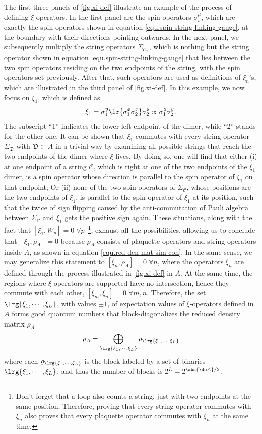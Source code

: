 The first three panels of \autoref{fig.xi-def} illustrate an example of the process of defining $\xi$-operators. In the first panel are the spin operators $\sigma^\mu_i$, which are exactly the spin operators shown in equation \eqref{equ.spin-string-linking-gauge}, at the boundary with their directions pointing outwards. In the next panel, we subsequently multiply the string operators $\Sigma_{\mathcal{C}_n}$, which is nothing but the string operator shown in equation \eqref{equ.spin-string-linking-gauge} that lies between the two spin operators residing on the two endpoints of the string, with the spin operators set previously. After that, such operators are used as definitions of $\xi_n$'s, which are illustrated in the third panel of \autoref{fig.xi-def}. In this example, we now focus on $\xi_1$, which is defined as
\[
\xi_1 = \sigma^y_1\lr{\sigma^x_1\sigma^x_2}\sigma^z_2 \propto \sigma_1^z\sigma_2^y.
\]
The subscript ``1'' indicates the lower-left endpoint of the dimer, while ``2'' stands for the other one. It can be shown that $\xi_1$ commutes with every string operator $\Sigma_{\mathfrak{D}}$ with $\mathfrak{D}\subset A$ in a trivial way by examining all possible strings that reach the two endpoints of the dimer where $\xi$ lives. By doing so, one will find that either (i) at one endpoint of a string $\mathcal{C}$, which is right at one of the two endpoints of the $\xi_1$ dimer, is a spin operator whose direction is parallel to the spin operator of $\xi_1$ on that endpoint; Or (ii) none of the two spin operators of $\Sigma_{\mathcal{C}}$, whose positions are the two endpoints of $\xi_1$, is parallel to the spin operator of $\xi_1$ at its position, such that the twice of sign flipping caused by the anti-commutation of Pauli algebra between $\Sigma_{\mathcal{C}}$ and $\xi_1$ gets the positive sign again. These situations, along with the fact that $[\xi_1,W_p]=0\;\forall p$~\footnote{Don't forget that a loop also counts a string, just with two endpoints at the same position. Therefore, proving that every string operator commutes with $\xi_n$ also proves that every plaquette operator commutes with $\xi_n$ at the same time.}, exhaust all the possibilities, allowing us to conclude that $[\xi_1,\rho_A]=0$ because $\rho_A$ consists of plaquette operators and string operators inside $A$, as shown in equation \eqref{equ.red-den-mat-sim-con}. In the same sense, we may generalize this statement to $[\xi_n,\rho_A]=0\;\forall n$, where the operators $\xi_n$ are defined through the process illustrated in \autoref{fig.xi-def} in $A$. At the same time, the regions where $\xi$-operators are supported have no intersection, hence they commute with each other, $[\xi_m,\xi_n]=0\;\forall m,n$. Therefore, the set $\lrg{\xi_1,\cdots,\xi_L}$, with values $\pm 1$, of expectation values of $\xi$-operators defined in $A$ forms good quantum numbers that block-diagonalizes the reduced density matrix $\rho_A$
\begin{equation}\label{equ.rho-block-diagonal-structure}
    \rho_A = \bigoplus_{\lrg{\xi_1,\cdots,\xi_L}} \varrho_{\lrg{\xi_1,\cdots,\xi_L}}
\end{equation}
where each $\varrho_{\lrg{\xi_1,\cdots,\xi_L}}$ is the block labeled by a set of binaries $\lrg{\xi_1,\cdots,\xi_L}$, and thus the number of blocks is $2^{L} = 2^{\abs{\de A}/2}$.


